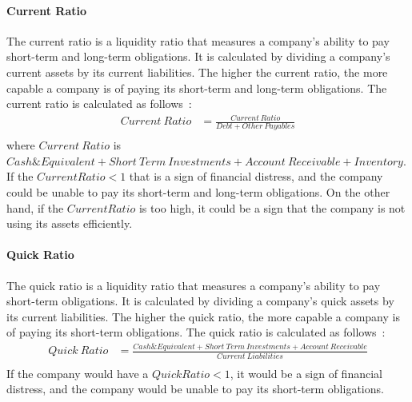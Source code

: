 \documentclass[../xlapes02]{subfiles}
\begin{document}
    \paragraph{Current Ratio}\label{par:current-ratio}
    The current ratio is a liquidity ratio that measures a company's ability to pay short-term and long-term obligations. It is calculated by dividing a company's current assets by its current liabilities. The higher the current ratio, the more capable a company is of paying its short-term and long-term obligations. The current ratio is calculated as follows~\cite{investopedia-current-ratio}:
    \begin{equation}
        \begin{split}
            Current\ Ratio&=\frac{Current\ Ratio}{Debt+Other\ Payables}\\
        \end{split}
    \end{equation}
    where $Current\ Ratio$ is $Cash\&Equivalent+Short\ Term\ Investments+Account\ Receivable+Inventory$. If the $Current Ratio < 1$ that is a sign of financial distress, and the company could be unable to pay its short-term and long-term obligations. On the other hand, if the $Current Ratio$ is too high, it could be a sign that the company is not using its assets efficiently.

    \paragraph{Quick Ratio}\label{par:quick-ratio}
    The quick ratio is a liquidity ratio that measures a company's ability to pay short-term obligations. It is calculated by dividing a company's quick assets by its current liabilities. The higher the quick ratio, the more capable a company is of paying its short-term obligations. The quick ratio is calculated as follows~\cite{investopedia-quick-ratio}:
    \begin{equation}
        \begin{split}
            Quick\ Ratio&=\frac{Cash\&Equivalent+Short\ Term\ Investments+Account\ Receivable}{Current\ Liabilities}\\
        \end{split}
    \end{equation}
    If the company would have a $Quick Ratio < 1$, it would be a sign of financial distress, and the company would be unable to pay its short-term obligations.
\end{document}
